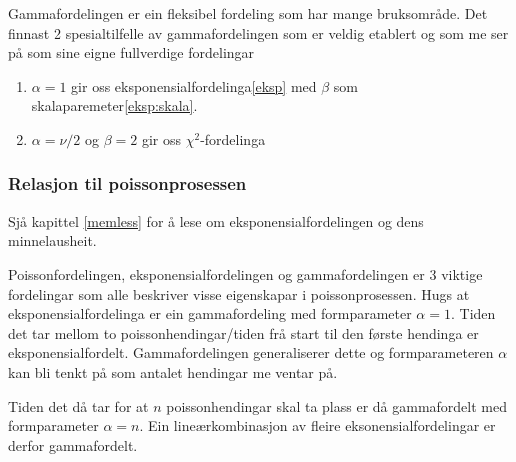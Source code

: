 Gammafordelingen er ein fleksibel fordeling som har mange bruksområde. Det finnast 2 spesialtilfelle av gammafordelingen som er veldig etablert og som me ser på som sine eigne fullverdige fordelingar

\begin{enumerate}
    \item $\alpha = 1$ gir oss eksponensialfordelinga\ref{eksp} med $\beta$ som skalaparemeter\ref{eksp:skala}.
    \item $\alpha = \nu/2$ og $\beta = 2$ gir oss $\chi^2$-fordelinga
\end{enumerate}

\subsubsection{Relasjon til poissonprosessen}
Sjå kapittel \ref{memless} for å lese om eksponensialfordelingen og dens minnelausheit.

Poissonfordelingen, eksponensialfordelingen og gammafordelingen er 3 viktige fordelingar som alle beskriver visse eigenskapar i poissonprosessen. Hugs at eksponensialfordelinga er ein gammafordeling med formparameter $\alpha = 1$. Tiden det tar mellom to poissonhendingar/tiden frå start til den første hendinga er eksponensialfordelt. Gammafordelingen generaliserer dette og formparameteren $\alpha$ kan bli tenkt på som antalet hendingar me ventar på.

Tiden det då tar for at $n$ poissonhendingar skal ta plass er då gammafordelt med formparameter $\alpha = n$. Ein lineærkombinasjon av fleire eksonensialfordelingar er derfor gammafordelt.

